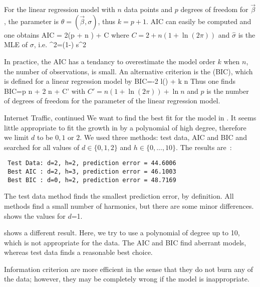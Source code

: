 For the linear regression model with $n$ data points
and $p$ degrees of freedom for $\vec{\beta}$, the
parameter is $\theta=(\vec{\beta},\sigma)$, thus
$k=p+1$. AIC can easily be computed and one obtains
 \be
 \mbox{AIC} = 2\left(p + n \ln  \hat{\sigma} \right) + C
 \ee
 where $C=2 +n \left(1+ \ln (2 \pi)\right)$ and
 $\hat{\sigma}$ is the MLE of $\sigma$, i.e.
 \ben
 \hat{\sigma}^2=\left(1-\right) s^2
 \een

In practice, the AIC has a tendancy to
overestimate the model order $k$ when $n$, the number of observations, is small. An alternative
criterion is the (BIC)\cite{BrockwellDavis02-book,ShumwayStoffer06-book},
which is defined for a linear regression model by \ben
 \mbox{BIC}=-2 l(\hat{\theta}) + k \ln n
\een %
Thus one
finds
 \be
 \mbox{BIC}=p \ln n  + 2 n \ln  \hat{\sigma}  + C'
 \ee
with $C'=n(1+\ln(2 \pi))+ \ln n$ and $p$ is the number
of degrees of freedom for the parameter of the linear
regression model.

\begin{figure}[!htbp]
\end{figure}
\begin{exnn}{Internet Traffic, continued}
We want to find the best fit for the model in
. It seems little
appropriate to fit the growth in
 by a polynomial of high
degree, therefore we limit $d$ to be $0,1$ or $2$. We
used three methods: test data, AIC and BIC and
searched for all values of $d\in \{0,1,2\}$ and $h \in
\{0,...,10\}$. The results are~:
 \begin{verbatim}
 Test Data: d=2, h=2, prediction error = 44.6006
 Best AIC : d=2, h=3, prediction error = 46.1003
 Best BIC : d=0, h=2, prediction error = 48.7169
\end{verbatim}
The test data method finds the smallest prediction error, by
definition. All methods find a small number of harmonics, but
there are some minor differences.
 shows the values for $d$=1.

 shows a different
result. Here, we try to use a polynomial of degree up to 10,
which is not appropriate for the data. The AIC and BIC find
aberrant models, whereas test data finds a reasonable best
choice.
\end{exnn}
Information criterion are more efficient in the sense that they
do not burn any of the data; however, they may be completely
wrong if the model is inappropriate.
